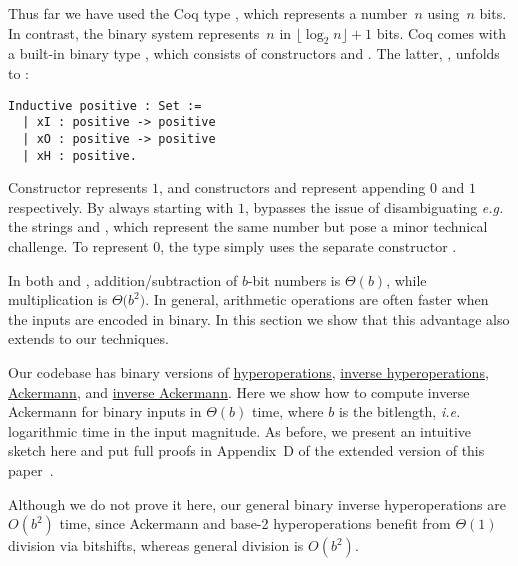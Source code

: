 Thus far we have used the Coq type , which represents
a number~$n$ using~$n$ bits.
In contrast, the binary system represents~$n$ in $\lfloor \log_{2} n \rfloor + 1$ bits.
Coq comes with a built-in binary type , 
which consists
of constructors  and . The latter, , unfolds to :

\begin{lstlisting}
Inductive positive : Set :=
  | xI : positive -> positive 
  | xO : positive -> positive
  | xH : positive.
\end{lstlisting}

Constructor  represents $1$, and constructors  and  represent
appending $0$ and $1$ respectively.
By always starting with $1$,  bypasses
the issue of disambiguating \emph{e.g.} the strings  and
, which represent the same number but pose
a minor technical challenge.
To represent $0$, the type  simply uses the separate constructor .

In both  and , addition/subtraction of $b$-bit
numbers is $\Theta(b)$, while multiplication is $\Theta \big(b^2\big)$.
In general, arithmetic operations are often faster when the inputs
are encoded in binary. 
In this section we show that this advantage also extends to our techniques.

Our codebase has binary versions of
	\href{https://github.com/inv-ack/inv-ack/blob/7270e64a2600b771f2b1b1b151f7d13fb2ae6c97/bin_repeater.v\#L78-L87}{\color{blue}hyperoperations},
	\href{https://github.com/inv-ack/inv-ack/blob/7270e64a2600b771f2b1b1b151f7d13fb2ae6c97/bin_applications.v\#L30-L36}{\color{blue}inverse hyperoperations},
	\href{https://github.com/inv-ack/inv-ack/blob/7270e64a2600b771f2b1b1b151f7d13fb2ae6c97/bin_repeater.v\#L157-L175}{\color{blue}Ackermann}, and
	\href{https://github.com/inv-ack/inv-ack/blob/7270e64a2600b771f2b1b1b151f7d13fb2ae6c97/bin_inv_ack.v\#L335-L342}{\color{blue}inverse Ackermann}.
Here we show how to compute inverse Ackermann for binary inputs in
$\Theta(b)$ time, where $b$ is the bitlength,
\emph{i.e.} logarithmic time in the input magnitude.
As before, we present an intuitive sketch here and put
full proofs in 
Appendix~D
 of the extended version of this paper~\cite{extendedinvack}.

\begin{rem}
Although we do not prove it here, our general binary inverse hyperoperations are $O(b^2)$ time,
since Ackermann and base-2 hyperoperations benefit from $\Theta(1)$ division via bitshifts,
whereas general division is $O(b^2)$.
\end{rem}

